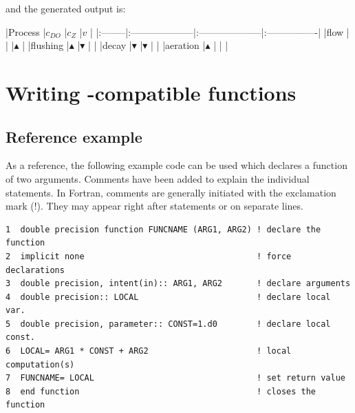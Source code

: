 \documentclass[times,onecolumn]{article}
\begin{document}
and the generated  output is:

\begin{shaded}
\begin{small}
\begin{Schunk}
\begin{Soutput}
|Process  |$c_{DO}$             |$c_Z$                |$v$              |
|:--------|:--------------------|:--------------------|:----------------|
|flow     |                     |                     |$\blacktriangle$ |
|flushing |$\blacktriangle$     |$\blacktriangledown$ |                 |
|decay    |$\blacktriangledown$ |$\blacktriangledown$ |                 |
|aeration |$\blacktriangle$     |                     |                 |
\end{Soutput}
\end{Schunk}
\end{small}
\end{shaded}


\section{Writing -compatible  functions} \label{sec:fortranFunctions}

\subsection{Reference example}

As a reference, the following example code can be used which declares a function of two arguments. Comments have been added to explain the individual statements. In Fortran, comments are generally initiated with the exclamation mark (!). They may appear right after statements or on separate lines.

\begin{shaded}
\begin{small}
\begin{verbatim}
1  double precision function FUNCNAME (ARG1, ARG2) ! declare the function
2  implicit none                                   ! force declarations
3  double precision, intent(in):: ARG1, ARG2       ! declare arguments
4  double precision:: LOCAL                        ! declare local var.
5  double precision, parameter:: CONST=1.d0        ! declare local const.
6  LOCAL= ARG1 * CONST + ARG2                      ! local computation(s)
7  FUNCNAME= LOCAL                                 ! set return value
8  end function                                    ! closes the function
\end{verbatim}
\end{small}
\end{shaded}
\end{document}
